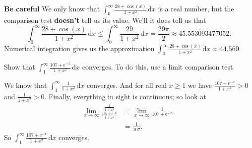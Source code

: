 \documentclass[12pt,fleqn,answers]{exam}
\begin{document}
\begin{questions}
\begin{solution}
  \textbf{Be careful} We only know that $\int_0^\infty \frac{28 + \cos(x)}{1+x^2} \, \mathrm{d} x$ is a real number,
  but the comparison test \textbf{doesn't} tell us its value.  We'll it does tell us that
  \begin{equation*}
    \int_0^\infty \frac{28 + \cos(x)}{1+x^2} \, \mathrm{d} x  \leq  \int_0^\infty \frac{29}{1+x^2} \, \mathrm{d} x
    = \frac{29 \ensuremath{\pi} }{2} \approx 45.553093477052.
  \end{equation*}
  Numerical integration gives us the approximation $ \int_0^\infty \frac{28 + \cos(x)}{1+x^2} \, \mathrm{d} x \approx
   44.560$
  \end{solution}

  \question [1] Show that 
  $\int_1^\infty \frac{107 + \mathrm{e}^{-x}}{1+x^2} \, \mathrm{d} x$
  converges. To do this, use a limit comparison test. 
  \begin{solution}[3.0in] We know that  $\int_1^\infty \frac{1}{1+x^2} \, \mathrm{d} x$ converges. And
  for all real $x \geq 1$ we have $\frac{107 + \mathrm{e}^{-x}}{1+x^2} > 0$ and $\frac{1}{1+x^2} >  0$.
  Finally, everything in sight is continuous; so look at
  \begin{align*}
   \lim_{x \to \infty} \frac{\frac{1}{1+x^2}} {\frac{107 + \mathrm{e}^{-x}} {1+x^2} } &=
    \lim_{x \to \infty} \frac{1}{107 + \mathrm{e}^{-x}}, \\
    &= \frac{1}{107}.   
    \end{align*}
  So $\int_1^\infty \frac{107 + \mathrm{e}^{-x}}{1+x^2} \, \mathrm{d} x$ converges.
  \end{solution}

  \end{questions}
\end{document}
